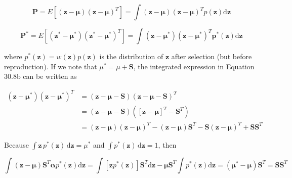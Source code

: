 \documentclass{article}
\begin{document}
\begin{equation}
\mathbf{P}=E\left[\left(\mathbf{z}-\boldsymbol{\mu}\right)\left(\mathbf{z}-\boldsymbol{\mu}\right)^{T}\right]=\int\left(\mathbf{z}-\boldsymbol{\mu}\right)\left(\mathbf{z}-\boldsymbol{\mu}\right)^{T}p(\mathbf{z})\mathrm{d}\mathbf{z}
\tag{30.8a}
\label{eq:30_8a}
\end{equation}

\begin{equation}
\mathbf{P}^{*}=E\left[\left(\mathbf{z}^{*}-\boldsymbol{\mu}^{*}\right)\left(\mathbf{z}^{*}-\boldsymbol{\mu}^{*}\right)^{T}\right]=\int\left(\mathbf{z}-\boldsymbol{\mu}^{*}\right)\left(\mathbf{z}-\boldsymbol{\mu}^{*}\right)^{T}\boldsymbol{p}^{*}\left(\mathbf{z}\right)\mathrm{d}\mathbf{z}
\tag{30.8b}
\label{eq:30_8b}
\end{equation}

where  $ p^{*}(\mathbf{z}) = w(\mathbf{z}) p(\mathbf{z}) $ is the distribution of  $ \mathbf{z} $ after selection (but before reproduction). If we note that  $ \mu^* = \mu + \mathbf{S} $, the integrated expression in Equation 30.8b can be written as

\begin{equation}
\begin{aligned}(\mathbf{z}-\boldsymbol{\mu}^{*})(\mathbf{z}-\boldsymbol{\mu}^{*})^{T}&=(\mathbf{z}-\boldsymbol{\mu}-\mathbf{S})(\mathbf{z}-\boldsymbol{\mu}-\mathbf{S})^{T}\\&=(\mathbf{z}-\boldsymbol{\mu}-\mathbf{S})([\mathbf{z}-\boldsymbol{\mu}]^{T}-\mathbf{S}^{T})\\&=(\mathbf{z}-\boldsymbol{\mu})(\mathbf{z}-\boldsymbol{\mu})^{T}-(\mathbf{z}-\boldsymbol{\mu})\mathbf{S}^{T}-\mathbf{S}\left(\mathbf{z}-\boldsymbol{\mu}\right)^{T}+\mathbf{S}\mathbf{S}^{T}\end{aligned}
\tag{30.8c}
\label{eq:30_8c}
\end{equation}

Because  $ \int \mathbf{z} \, p^*(\mathbf{z}) \, \mathrm{d}\mathbf{z} = \mu^* $ and  $ \int p^*(\mathbf{z}) \, \mathrm{d}\mathbf{z} = 1 $, then

\begin{equation}
\int(\mathbf{z}-\boldsymbol{\mu})\mathbf{S}^{T}\mathbf{\alpha}p^{*}(\mathbf{z})\mathrm{d}\mathbf{z}=\int\left[\mathbf{z}p^{*}(\mathbf{z})\right]\mathbf{S}^{T}\mathrm{d}\mathbf{z}-\boldsymbol{\mu}\mathbf{S}^{T}\int p^{*}(\mathbf{z})\mathrm{d}\mathbf{z}=(\boldsymbol{\mu}^{*}-\boldsymbol{\mu})\mathbf{S}^{T}=\mathbf{S}\mathbf{S}^{T}
\end{equation}
\end{document}

